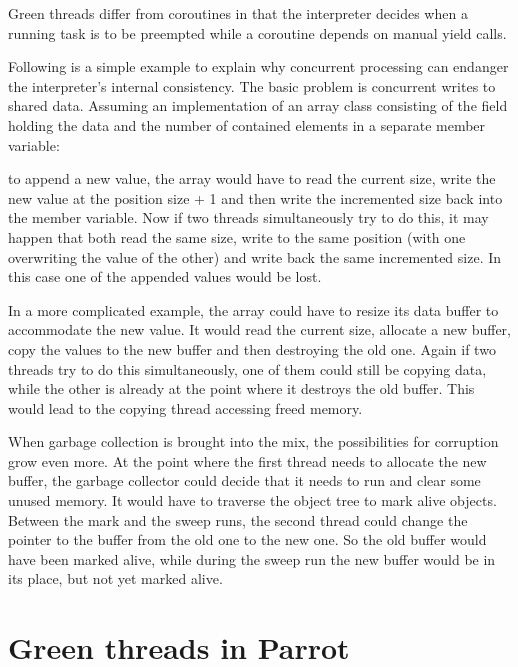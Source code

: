 \documentclass[bachelor,english]{hgbthesis}
\begin{document}
Green threads differ from coroutines in that the interpreter decides when a running task is to be preempted while a coroutine depends on manual yield calls.

Following is a simple example to explain why concurrent processing can endanger the interpreter's internal consistency. The basic problem is concurrent writes to shared data. Assuming an implementation of an array class consisting of the field holding the data and the number of contained elements in a separate member variable:
\begin{CCode}
pmclass ResizableIntegerArray auto_attrs provides array {
    ATTR INTVAL   size;      /* number of INTVALs stored in this array */
    ATTR INTVAL * int_array; /* INTVALs are stored here */
\end{CCode}
to append a new value, the array would have to read the current size, write the new value at the position size + 1 and then write the incremented size back into the member variable.
Now if two threads simultaneously try to do this, it may happen that both read the same size, write to the same position (with one overwriting the value of the other) and write back the same incremented size. In this case one of the appended values would be lost.

In a more complicated example, the array could have to resize its data buffer to accommodate the new value. It would read the current size, allocate a new buffer, copy the values to the new buffer and then destroying the old one. Again if two threads try to do this simultaneously, one of them could still be copying data, while the other is already at the point where it destroys the old buffer. This would lead to the copying thread accessing freed memory.

When garbage collection is brought into the mix, the possibilities for corruption grow even more. At the point where the first thread needs to allocate the new buffer, the garbage collector could decide that it needs to run and clear some unused memory. It would have to traverse the object tree to mark alive objects. Between the mark and the sweep runs, the second thread could change the pointer to the buffer from the old one to the new one. So the old buffer would have been marked alive, while during the sweep run the new buffer would be in its place, but not yet marked alive.

\section{Green threads in Parrot}
\end{document}
